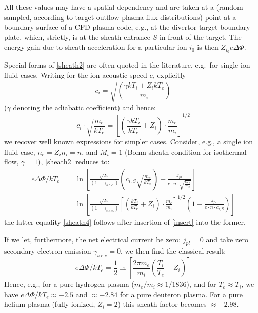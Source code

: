 All these values may have a spatial dependency and are taken at a (random
sampled, according to target outflow plasma flux distributions) point at a
boundary surface of a \ac{CFD} plasma code, e.g., at the divertor target
boundary plate, which, strictly, is at the sheath entrance $S$ in front of the
target.
The energy gain due to sheath acceleration for a particular ion $i_0$ is then
$Z_{i_0} e \Delta\Phi$.

Special forms of \cref{sheath2} are often quoted in the literature, e.g.\ for
single ion fluid cases.
Writing for the ion acoustic speed $c_i$ explicitly
\begin{displaymath}
  c_i =
  \sqrt{\left(\frac{\gamma kT_i + Z_i kT_e}{m_i}\right)}
\end{displaymath}
($\gamma$ denoting the adiabatic coefficient) and hence:
\begin{equation}
  \label{insert}
  c_i \cdot \sqrt{\frac{m_e}{kT_e}} = \left[ \left( \frac{\gamma
      kT_i}{kT_e} + Z_i \right) \cdot \frac{m_e}{m_i} \right]^{1/2}
\end{equation}
we recover well known expressions for simpler cases.
Consider, e.g., a single ion fluid case, $n_e = Z_i n_i = n$,  and $M_i = 1$
(Bohm sheath condition for isothermal flow, $\gamma = 1$), \cref{sheath2}
reduces to:
\begin{align}
  \label{sheath3}
  e \Delta\Phi/kT_e & =
  \ln\left[\frac{\sqrt{2\pi}}{(1-\gamma_{s.e.e.})}
    \left({c_{i,S}}
    \sqrt{\frac{m_e}{kT_e}}\right)-\frac{j_{pl}}{e \cdot n \cdot \sqrt{\frac{kT_e}{m_e}}}\right] \\
                    & =
  \ln\left[\frac{\sqrt{2\pi}}{(1-\gamma_{s.e.e.})}
    \left[ \left( \frac{
        kT_i}{kT_e} + Z_i \right) \cdot \frac{m_e}{m_i}
      \right]^{1/2}\left(1-\frac{j_{pl}}{e \cdot n \cdot c_{i,S}}\right)\right]
  \label{sheath4}
\end{align}
the latter equality \cref{sheath4} follows after insertion of \cref{insert}
into the former.

If we let, furthermore, the net electrical current be zero: $j_{pl} = 0$ and
take zero secondary electron emission $\gamma_{s.e.e} = 0$, we then find the
classical result:
\begin{displaymath}
  e \Delta\Phi/kT_e = \frac{1}{2} \ln{\left[ \frac {2\pi m_e}{m_i} \left(
      \frac{T_i}{T_e} + Z_i \right) \right]}
\end{displaymath}
Hence, e.g.,  for a pure hydrogen plasma ($m_e/m_i \approx 1/1836$), and for
$T_e \approx T_i$, we have $e \Delta\Phi/kT_e \approx -2.5 $ and $ \approx
  -2.84$ for a pure deuteron plasma.
For a pure helium plasma (fully ionized, $Z_i=2$) this sheath factor becomes
$\approx -2.98$.

